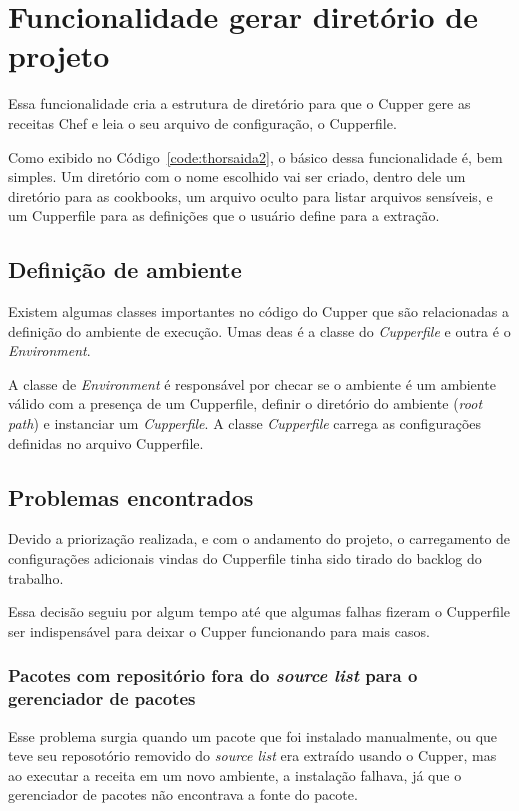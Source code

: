 \section{Funcionalidade gerar diretório de projeto}
\label{sec:proj}

Essa funcionalidade cria a estrutura de diretório para que o Cupper gere as 
receitas Chef e leia o seu arquivo de configuração, o Cupperfile.

Como exibido no Código~\ref{code:thorsaida2}, o básico dessa funcionalidade é, bem
simples. Um diretório com o nome escolhido vai ser criado, dentro dele um diretório
para as cookbooks, um arquivo oculto para listar arquivos sensíveis, e um 
Cupperfile para as definições que o usuário define para a extração.

\subsection{Definição de ambiente}
Existem algumas classes importantes no código do Cupper que são relacionadas a
definição do ambiente de execução. Umas deas é a classe do \textit{Cupperfile} e outra
é o \textit{Environment}.

A classe de \textit{Environment} é responsável por checar se o ambiente é um
ambiente válido com a presença de um Cupperfile, definir o diretório do ambiente
(\textit{root\underline{ }path}) e instanciar um \textit{Cupperfile}. A classe \textit{Cupperfile} carrega as configurações definidas no arquivo Cupperfile.

\subsection{Problemas encontrados}
Devido a priorização realizada, e com o andamento do projeto, o carregamento de
configurações adicionais vindas do Cupperfile tinha sido tirado do backlog do
trabalho.

Essa decisão seguiu por algum tempo até que algumas falhas fizeram o Cupperfile
ser indispensável para deixar o Cupper funcionando para mais casos.

\subsubsection{Pacotes com repositório fora do \textit{source list} para o 
gerenciador de pacotes}
Esse problema surgia quando um pacote que foi instalado manualmente, ou que
teve seu reposotório removido do \textit{source list} era extraído usando o Cupper,
mas ao executar a receita em um novo ambiente, a instalação falhava, já que 
o gerenciador de pacotes não encontrava a fonte do pacote.

